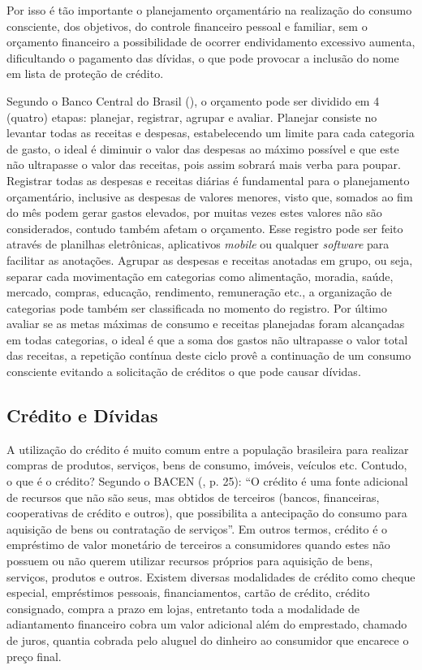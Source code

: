 Por isso é tão importante o planejamento orçamentário na realização do consumo consciente, dos objetivos, do controle financeiro pessoal e familiar, sem o orçamento financeiro a possibilidade de ocorrer endividamento excessivo aumenta, dificultando o pagamento das dívidas, o que pode provocar a inclusão do nome em lista de proteção de crédito.

Segundo o Banco Central do Brasil (\citeyear{bacen2013}), o orçamento pode ser dividido em 4 (quatro) etapas: planejar, registrar, agrupar e avaliar. Planejar consiste no levantar todas as receitas e despesas, estabelecendo um limite para cada categoria de gasto, o ideal é diminuir o valor das despesas ao máximo possível e que este não ultrapasse o valor das receitas, pois assim sobrará mais verba para poupar. Registrar todas as despesas e receitas diárias é fundamental para o planejamento orçamentário, inclusive as despesas de valores menores, visto que, somados ao fim do mês podem gerar gastos elevados, por muitas vezes estes valores não são considerados, contudo também afetam o orçamento. Esse registro pode ser feito através de planilhas eletrônicas, aplicativos \textit{mobile} ou qualquer \textit{software} para facilitar as anotações. Agrupar as despesas e receitas anotadas em grupo, ou seja, separar cada movimentação em categorias como alimentação, moradia, saúde, mercado, compras, educação, rendimento, remuneração etc., a organização de categorias pode também ser classificada no momento do registro. Por último avaliar se as metas máximas de consumo e receitas planejadas foram alcançadas em todas categorias, o ideal é que a soma dos gastos não ultrapasse o valor total das receitas, a repetição contínua deste ciclo provê a continuação de um consumo consciente evitando a solicitação de créditos o que pode causar dívidas.

\subsection{Crédito e Dívidas}
A utilização do crédito é muito comum entre a população brasileira para realizar compras de produtos, serviços, bens de consumo, imóveis, veículos etc. Contudo, o que é o crédito? Segundo o BACEN (\citeyear{bacen2013}, p. 25): “O crédito é uma fonte adicional de recursos que não são seus, mas obtidos de terceiros (bancos, financeiras, cooperativas de crédito e outros), que possibilita a antecipação do consumo para aquisição de bens ou contratação de serviços”. Em outros termos, crédito é o empréstimo de valor monetário de terceiros a consumidores quando estes não possuem ou não querem utilizar recursos próprios para aquisição de bens, serviços, produtos e outros. Existem diversas modalidades de crédito como cheque especial, empréstimos pessoais, financiamentos, cartão de crédito, crédito consignado, compra a prazo em lojas, entretanto toda a modalidade de adiantamento financeiro cobra um valor adicional além do emprestado, chamado de juros, quantia cobrada pelo aluguel do dinheiro ao consumidor que encarece o preço final.

